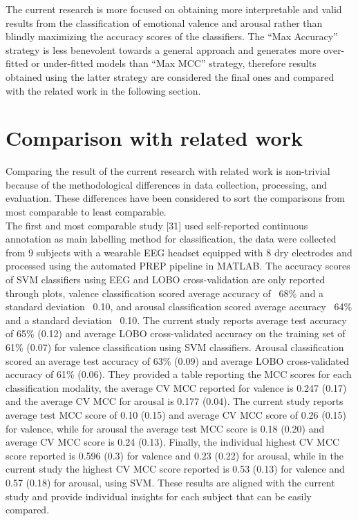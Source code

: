 The current research is more focused on obtaining more interpretable and valid results from the classification of emotional valence and arousal rather than blindly maximizing the accuracy scores of the classifiers. The “Max Accuracy” strategy is less benevolent towards a general approach and generates more over-fitted or under-fitted models than “Max MCC” strategy, therefore results obtained using the latter strategy are considered the final ones and compared with the related work in the following section.

\section{Comparison with related work}
\label{sec:comparison}
Comparing the result of the current research with related work is non-trivial because of the methodological differences in data collection, processing, and evaluation. These differences have been considered to sort the comparisons from most comparable to least comparable. 
\\
The first and most comparable study [31] used self-reported continuous annotation as main labelling method for classification, the data were collected from 9 subjects with a wearable EEG headset equipped with 8 dry electrodes and processed using the automated PREP pipeline in MATLAB. The accuracy scores of SVM classifiers using EEG and LOBO cross-validation are only reported through plots, valence classification scored average accuracy of ~68\% and a standard deviation ~0.10, and arousal classification scored average accuracy ~64\% and a standard deviation ~0.10. The current study reports average test accuracy of 65\% (0.12) and average LOBO cross-validated accuracy on the training set of 61\% (0.07) for valence classification using SVM classifiers. Arousal classification scored an average test accuracy of 63\% (0.09) and average LOBO cross-validated accuracy of 61\% (0.06). They provided a table reporting the MCC scores for each classification modality, the average CV MCC reported for valence is 0.247 (0.17) and the average CV MCC for arousal is 0.177 (0.04). The current study reports average test MCC score of 0.10 (0.15) and average CV MCC score of 0.26 (0.15) for valence, while for arousal the average test MCC score is 0.18 (0.20) and average CV MCC score is 0.24 (0.13). Finally, the individual highest CV MCC score reported is 0.596 (0.3) for valence and 0.23 (0.22) for arousal, while in the current study the highest CV MCC score reported is 0.53 (0.13) for valence and 0.57 (0.18) for arousal, using SVM. These results are aligned with the current study and provide individual insights for each subject that can be easily compared.

